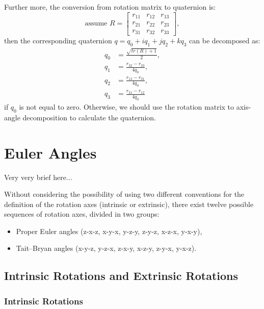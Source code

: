 \documentclass{article}
\begin{document}
Further more, the conversion from rotation matrix to quaternion is:
\begin{displaymath}
  \text{assume } R = \begin{bmatrix}
    r_{11} & r_{12} & r_{13} \\
    r_{21} & r_{22} & r_{23} \\
    r_{31} & r_{32} & r_{33}
  \end{bmatrix},
\end{displaymath}
then the corresponding quaternion $q = q_0+iq_1+jq_2+kq_3$ can be decomposed as:
\begin{equation}
  \begin{split}
    q_0 &= \frac{\sqrt{tr(R)+1}}{2},    \\
    q_1 &= \frac{r_{32}-r_{23}}{4q_0}, \\
    q_2 &= \frac{r_{13}-r_{31}}{4q_0}, \\
    q_3 &= \frac{r_{21}-r_{12}}{4q_0}
  \end{split}
\end{equation}
if $q_0$ is not equal to zero. Otherwise, we should use the rotation matrix to axis-angle decomposition to calculate the quaternion.

\section{Euler Angles}

Very very brief here...

Without considering the possibility of using two different conventions for the definition of the rotation axes (intrinsic or extrinsic), there exist twelve possible sequences of rotation axes, divided in two groups:

\begin{itemize}
\item Proper Euler angles (z-x-z, x-y-x, y-z-y, z-y-z, x-z-x, y-x-y),
\item Tait–Bryan angles (x-y-z, y-z-x, z-x-y, x-z-y, z-y-x, y-x-z).
\end{itemize}


\subsection{Intrinsic Rotations and Extrinsic Rotations}

\subsubsection*{Intrinsic Rotations}
\end{document}
